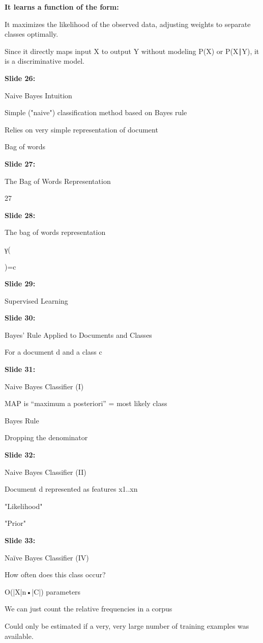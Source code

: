 \documentclass[11pt,a4paper]{article}
\begin{document}
\textbf{It learns a function of the form:} 

It maximizes the likelihood of the observed data, adjusting weights to separate classes optimally.​

Since it directly maps input X to output Y without modeling P(X) or P(X∣Y), it is a discriminative model.​

\textbf{Slide 26:}

Naive Bayes Intuition

Simple ("naive") classification method based on Bayes rule

Relies on very simple representation of document

Bag of words

\textbf{Slide 27:}

The Bag of Words Representation

27

\textbf{Slide 28:}

The bag of words representation

γ(

)=c

\textbf{Slide 29:}

Supervised Learning

\textbf{Slide 30:}

Bayes’ Rule Applied to Documents and Classes

For a document d and a class c

\textbf{Slide 31:}

Naive Bayes Classifier (I)

MAP is “maximum a posteriori”  = most likely class

Bayes Rule

Dropping the denominator

\textbf{Slide 32:}

Naive Bayes Classifier (II)

Document d represented as features x1..xn

"Likelihood"

"Prior"

\textbf{Slide 33:}

Naïve Bayes Classifier (IV)

How often does this class occur?

O(|X|n•|C|) parameters

We can just count the relative frequencies in a corpus

Could only be estimated if a very, very large number of training examples was available.
\end{document}
